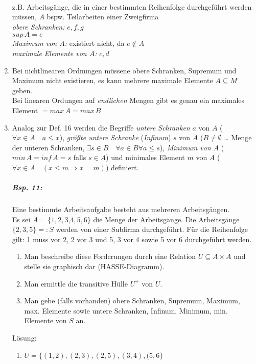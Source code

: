 \begin{enumerate}
\begin{tikzpicture}[scale=.5]
\end{tikzpicture}\\
z.B. Arbeitsgänge, die in einer bestimmten Reihenfolge durchgeführt werden müssen, $A$ bspw. Teilarbeiten einer Zweigfirma\\
\emph{obere Schranken:} $e,f,g$\\
\emph{$sup\, A$}$=e$\\
\emph{Maximum von $A$:} existiert nicht, da $e \not \in A$\\
\emph{maximale Elemente von $A$:} $c,d$
\item Bei nichtlinearen Ordnungen müssene obere Schranken, Supremum und Maximum nicht existieren, es kann mehrere maximale Elemente $A\subseteq M$ geben.\\
Bei linearen Ordungen auf \emph{endlichen} Mengen gibt es genau ein maximales Element $=max\, A =max\, B$
\item Analog zur Def. 16 werden die Begriffe \emph{untere Schranken} $a$ von $A$ ($\forall x \in A \quad a \leq x$), \emph{größte untere Schranke} (\emph{Infinum}) $s$ von $A$ ($B\not = \emptyset$ … Menge der unteren Schranken, $\exists s \in B \quad \forall a \in B \forall a \leq s$), \emph{Minimum von $A$} ($min \, A = inf\, A = s$ falls $s \in A$) und minimales Element $m$ von $A$ ($\forall x \in A \quad (x\leq m \Rightarrow x = m)$) definiert.
\subparagraph{Bsp. 11:} \parskp
Eine bestimmte Arbeitsaufgabe besteht aus mehreren Arbeitsgängen. \\
Es sei $A=\{1,2,3$,$4,5,6\}$ die Menge der Arbeitsgänge. Die Arbeitsgänge $\{2,3,5\}=:S$ werden von einer Subfirma durchgeführt. Für die Reihenfolge gilt: 1 muss vor 2, 2 vor 3 und 5, 3 vor 4 sowie 5 vor 6 durchgeführt werden.
\begin{enumerate}  [label=\alph*)]
\item Man beschreibe diese Forderungen durch eine Relation $U\subseteq A\times A$ und stelle sie graphisch dar (HASSE-Diagramm).
\item Man ermittle die transitive Hülle $U^+$ von $U$.
\item Man gebe (falls vorhanden) obere Schranken, Supremum, Maximum, max. Elemente sowie untere Schranken, Infinum, Minimum, min. Elemente von $S$ an.
\end{enumerate}
Lösung:
\begin{enumerate}   [label=\alph*)]
\item $U=\{(1,2),(2,3),(2,5),(3,4),(5,6\}$\\
\end{enumerate}
\end{enumerate}
